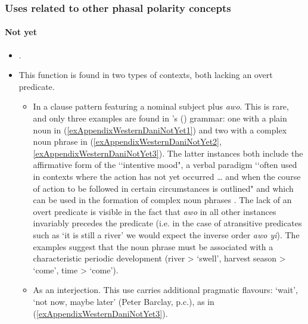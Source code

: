 \subsubsection{Uses related to other phasal polarity concepts}
\paragraph{Not yet}\label{appendixWesternDaniNotYet}
\begin{itemize}
\item \textcite[192, 440–441]{Barclay2008}.
\item This function is found in two types of contexts, both lacking an overt predicate.
	\begin{itemize}
		\item In a clause pattern featuring a nominal subject plus \textit{awo}. This is rare, and only three examples are found in \citeauthor{Barclay2008}'s (\citeyear{Barclay2008}) grammar: one with a plain noun in (\ref{exAppendixWesternDaniNotYet1}) and two with a complex noun phrase in (\ref{exAppendixWesternDaniNotYet2}, \ref{exAppendixWesternDaniNotYet3}). The latter instances both include the affirmative form of the \lq\lq intentive mood", a verbal paradigm \lq\lq often used in contexts where the action has not yet occurred … and when the course of action to be followed in certain circumstances is outlined" \parencite[236]{Barclay2008} and which can be used in the formation of complex noun phrases \parencite[238]{Barclay2008}. The lack of an overt predicate is visible in the fact that \textit{awo} in all other instances invariably precedes the predicate (i.e. in the case of atransitive predicates such as \lq it is still a river' we would expect the inverse order \textit{awo yi}). The examples suggest that the noun phrase must be associated with a characteristic periodic development (river > \lq swell', harvest season > \lq come', time > \lq come'). 

\item As an interjection. This use carries additional pragmatic flavours: \lq wait', \lq not now, maybe later' (Peter Barclay, p.c.), as in (\ref{exAppendixWesternDaniNotYet3}).
	\end{itemize}
\end{itemize}

